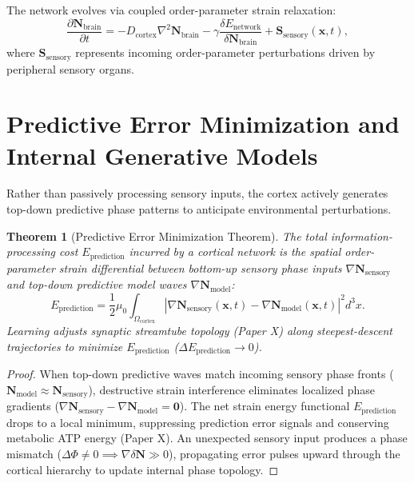 \documentclass[11pt,a4paper]{article}
\newtheorem{thm}{Theorem}
\begin{document}
	The network evolves via coupled order-parameter strain relaxation:
	\begin{equation}
		\frac{\partial \mathbf{N}_{\text{brain}}}{\partial t} = -D_{\text{cortex}} \nabla^2 \mathbf{N}_{\text{brain}} - \gamma \frac{\delta E_{\text{network}}}{\delta \mathbf{N}_{\text{brain}}} + \mathbf{S}_{\text{sensory}}(\mathbf{x}, t),
		\label{eq:cortical_field_evolution}
	\end{equation}
	where $\mathbf{S}_{\text{sensory}}$ represents incoming order-parameter perturbations driven by peripheral sensory organs.
	
	\section{Predictive Error Minimization and Internal Generative Models}
	\label{sec:predictive_processing}
	
	Rather than passively processing sensory inputs, the cortex actively generates top-down predictive phase patterns to anticipate environmental perturbations.
	
	\begin{thm}[Predictive Error Minimization Theorem]
		\label{thm:predictive_error}
		The total information-processing cost $E_{\text{prediction}}$ incurred by a cortical network is the spatial order-parameter strain differential between bottom-up sensory phase inputs $\nabla \mathbf{N}_{\text{sensory}}$ and top-down predictive model waves $\nabla \mathbf{N}_{\text{model}}$:
		\begin{equation}
			E_{\text{prediction}} = \frac{1}{2}\mu_0 \int_{\Omega_{\text{cortex}}} \left| \nabla \mathbf{N}_{\text{sensory}}(\mathbf{x}, t) - \nabla \mathbf{N}_{\text{model}}(\mathbf{x}, t) \right|^2 d^3x.
			\label{eq:predictive_error_functional}
		\end{equation}
		Learning adjusts synaptic streamtube topology (Paper X) along steepest-descent trajectories to minimize $E_{\text{prediction}}$ ($\Delta E_{\text{prediction}} \to 0$).
	\end{thm}
	
	\begin{proof}
		When top-down predictive waves match incoming sensory phase fronts ($\mathbf{N}_{\text{model}} \approx \mathbf{N}_{\text{sensory}}$), destructive strain interference eliminates localized phase gradients ($\nabla \mathbf{N}_{\text{sensory}} - \nabla \mathbf{N}_{\text{model}} = \mathbf{0}$). The net strain energy functional $E_{\text{prediction}}$ drops to a local minimum, suppressing prediction error signals and conserving metabolic ATP energy (Paper X). An unexpected sensory input produces a phase mismatch ($\Delta \Phi \neq 0 \implies \nabla \delta \mathbf{N} \gg 0$), propagating error pulses upward through the cortical hierarchy to update internal phase topology.
	\end{proof}
	
\end{document}
